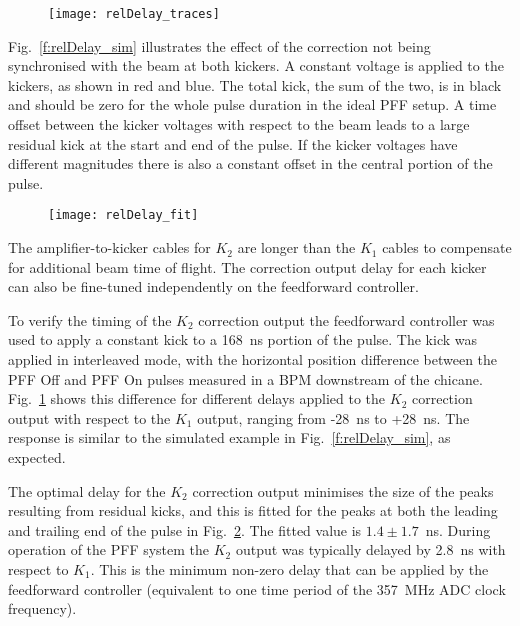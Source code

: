 \begin{figure}
 \centering
  \texttt{[image: relDelay\_traces]}%
  \caption{\label{f:relDelay_traces}
  }
\end{figure}

Fig.~\ref{f:relDelay_sim} illustrates the effect of the 
correction not being synchronised with the beam at 
both kickers. A constant voltage is applied to the kickers, as shown in red and 
blue. The total kick, the sum of the two, is in black and should be zero for 
the whole pulse duration in the ideal PFF setup. A time offset between the 
kicker voltages with respect to the beam leads to a large residual kick at the 
start and end of the pulse. If the kicker voltages have different magnitudes 
there is also a constant offset in the central portion of the pulse.

\begin{figure}
 \centering
  \texttt{[image: relDelay\_fit]}%
  \caption{\label{f:relDelay_fit}
  }
\end{figure}

The amplifier-to-kicker cables for \(K_2\) are longer than the \(K_1\) cables 
to compensate for additional beam time of flight. The 
correction output delay for each kicker can also be fine-tuned independently on 
the feedforward controller. 

To verify the timing of the \(K_2\) correction output the feedforward 
controller was used to apply a constant kick to a 168~ns portion of the pulse. 
The kick was applied in interleaved mode, with the horizontal position 
difference between the PFF Off and PFF On pulses measured in a BPM downstream 
of the chicane.
Fig.~\ref{f:relDelay_traces} shows this difference for different delays 
applied to the \(K_2\) correction output with respect to the \(K_1\) output, 
ranging from -28~ns to +28~ns. The response is similar to the simulated example 
in Fig.~\ref{f:relDelay_sim}, as expected.

The optimal delay for the \(K_2\) correction output minimises the size of the 
peaks resulting from residual kicks, and this is fitted for the peaks at both 
the leading and trailing end of the pulse in Fig.~\ref{f:relDelay_fit}. The 
fitted value is \(1.4\pm1.7\)~ns. During operation of the PFF system the 
\(K_2\) output was typically delayed by 2.8~ns with respect to \(K_1\). This is 
the minimum non-zero delay that can be applied by the feedforward controller 
(equivalent to one time period of the 357~MHz ADC clock frequency).

